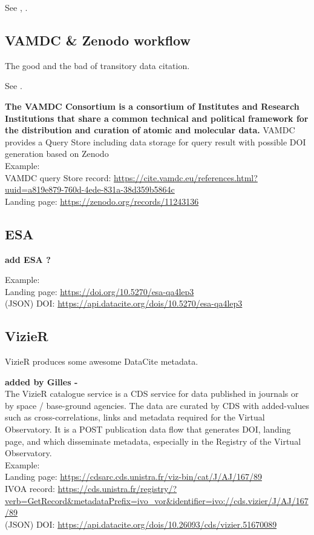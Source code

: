 \documentclass[11pt,a4paper]{ivoa}
\begin{document}
See \citep{2023ChNew..34....5D}, \citep{2018EPJWC.18612011R}.

	
\subsection{VAMDC \& Zenodo workflow}
The good and the bad of transitory data citation.

See \citep{2018Galax...6..105M}.

\textbf{\color{red} The VAMDC Consortium is a consortium of Institutes and Research Institutions that share a common technical and political framework for the distribution and curation of atomic and molecular data.}
{\color{red} 
VAMDC provides a Query Store including data storage for query result with possible DOI generation based on Zenodo}\\

Example:\\
VAMDC query Store record: \url{https://cite.vamdc.eu/references.html?uuid=a819e879-760d-4ede-831a-38d359b5864c}\\
Landing page: \url{https://zenodo.org/records/11243136}

\subsection{ESA}
\textbf{\color{red}  add ESA ?}

Example:\\
Landing page: \url{https://doi.org/10.5270/esa-qa4lep3}\\
(JSON) DOI: \url{https://api.datacite.org/dois/10.5270/esa-qa4lep3}

\subsection{VizieR}
VizieR produces some awesome DataCite metadata.


\textbf{\color{red} added by Gilles - }\\

The VizieR catalogue service is a CDS service for data published in journals or by space / base-ground agencies. The data are curated by CDS with added-values such as cross-correlations, links and metadata required for the Virtual Observatory. It is a POST publication data flow that generates DOI, landing page, and which disseminate metadata, especially in the Registry of the Virtual Observatory.\\


Example:\\
Landing page: \url{https://cdsarc.cds.unistra.fr/viz-bin/cat/J/AJ/167/89}\\
IVOA record: \url{https://cds.unistra.fr/registry/?verb=GetRecord&metadataPrefix=ivo_vor&identifier=ivo://cds.vizier/J/AJ/167/89}\\
(JSON) DOI: \url{https://api.datacite.org/dois/10.26093/cds/vizier.51670089}
\end{document}
